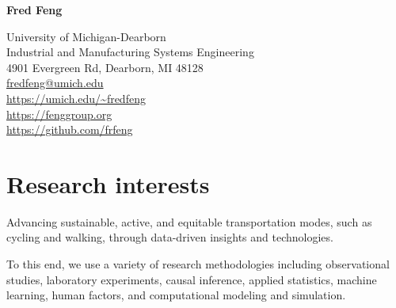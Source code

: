 \documentclass[11pt]{article}
\title{\vspace{-5em}}   %
\author{}
\date{}
\newenvironment{main}
{\begin{adjustwidth}{3em}{}}
{\end{adjustwidth}}
\begin{document}
\maketitle

\begin{multicols}{2}

{\Huge\textbf{Fred Feng}}  %


\hfill\break
\hfill\break
\hfill\break

\begin{flushright}
{
University of Michigan-Dearborn\\
Industrial and Manufacturing Systems Engineering\\
4901 Evergreen Rd, Dearborn, MI 48128\\
\href{mailto:fredfeng@umich.edu}{fredfeng@umich.edu}\\
\url{https://umich.edu/~fredfeng}\\
\url{https://fenggroup.org}\\
\url{https://github.com/frfeng}\\
}
\end{flushright}
\end{multicols}

\vspace{-6ex}
\noindent\makebox[\linewidth]{\rule{\textwidth}{0.8pt}}

\section*{Research interests}
\begin{main}

Advancing sustainable, active, and equitable transportation modes,
such as cycling and walking,
through data-driven insights and technologies.

To this end, we use a variety of research methodologies including 
observational studies, 
laboratory experiments, 
causal inference,
applied statistics, 
machine learning,
human factors, and
computational modeling and simulation.



\end{main}
\end{document}

